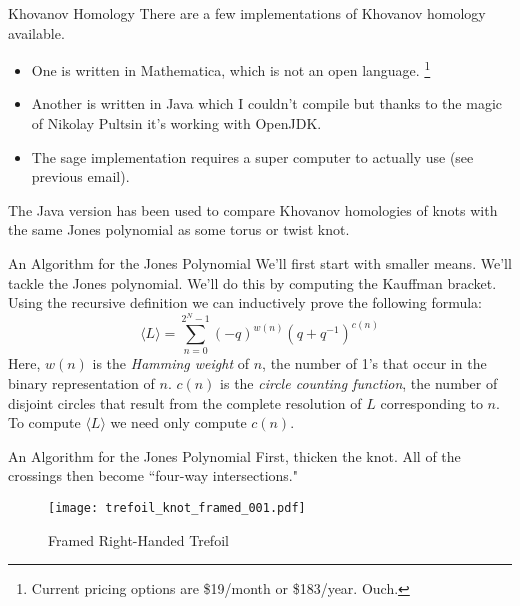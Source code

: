 \documentclass{beamer}
\begin{document}
    \begin{frame}{Khovanov Homology}
        There are a few implementations of Khovanov homology available.
        \begin{itemize}
            \item One is written in Mathematica, which is not an open language.%
                  \footnote{Current pricing options are \$19/month
                            or \$183/year. Ouch.}
            \item Another is written in Java which I couldn't compile but thanks
                  to the magic of Nikolay Pultsin it's working with OpenJDK.
            \item The sage implementation requires a super computer to actually
                  use (see previous email).
        \end{itemize}
        The Java version has been used to compare Khovanov homologies of
        knots with the same Jones polynomial as some torus or twist knot.
    \end{frame}
    \begin{frame}{An Algorithm for the Jones Polynomial}
        We'll first start with smaller means. We'll tackle the Jones
        polynomial. We'll do this by computing the Kauffman bracket. Using the
        recursive definition we can inductively prove the following formula:
        \begin{equation}
            \label{eqn:kauffman_bracket}%
            \langle{L}\rangle=\sum_{n=0}^{2^{N}-1}
                (-q)^{w(n)}(q+q^{-1})^{c(n)}
        \end{equation}
        Here, $w(n)$ is the \textit{Hamming weight} of $n$, the number of 1's
        that occur in the binary representation of $n$. $c(n)$ is the
        \textit{circle counting function}, the number of disjoint circles that
        result from the complete resolution of $L$ corresponding to $n$.
        To compute $\langle{L}\rangle$ we need only compute $c(n)$.
    \end{frame}
    \begin{frame}{An Algorithm for the Jones Polynomial}
        First, thicken the knot. All of the crossings then become
        ``four-way intersections."
        \begin{figure}
            \centering
            \texttt{[image: trefoil\_knot\_framed\_001.pdf]}
            \caption{Framed Right-Handed Trefoil}
            \label{fig:trefoil_knot_framed_001}
        \end{figure}
    \end{frame}
\end{document}
